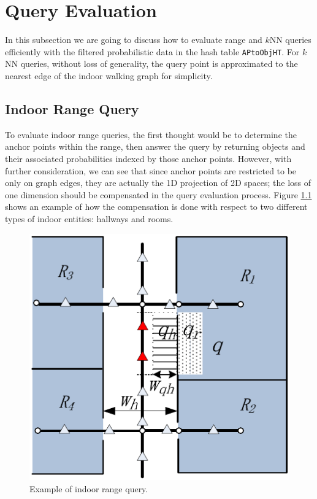 \documentclass[12pt]{report}
\begin{document}
\chapter{Query Evaluation}
\label{sec:query-evaluation}
In this subsection we are going to discuss how to evaluate range
and \(k\)NN queries efficiently with the filtered probabilistic
data in the hash table \texttt{APtoObjHT}.  For \(k\)NN queries, without
loss of generality, the query point is approximated to the nearest
edge of the indoor walking graph for simplicity.

\section{Indoor Range Query}
\label{sec:org4ae245f}

To evaluate indoor range queries, the first thought would be to
determine the anchor points within the range, then answer the
query by returning objects and their associated probabilities
indexed by those anchor points.  However, with further
consideration, we can see that since anchor points are restricted
to be only on graph edges, they are actually the 1D projection of
2D spaces; the loss of one dimension should be compensated in the
query evaluation process.  Figure \ref{fig:range-query} shows an example
of how the compensation is done with respect to two different
types of indoor entities: hallways and rooms.

\begin{figure}[htbp]
\centering
\includegraphics[width=.5\textwidth]{img/range-query.pdf}
\caption{\label{fig:range-query}
Example of indoor range query.}
\end{figure}
\end{document}

